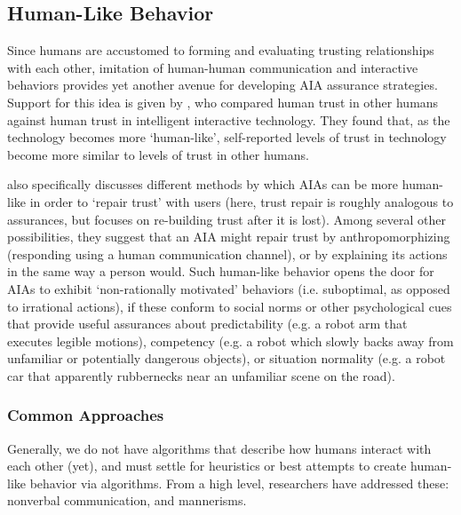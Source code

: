 \subsection{Human-Like Behavior} \label{sec:human_behavior}
Since humans are accustomed to forming and evaluating trusting relationships with each other, imitation of human-human communication and interactive behaviors provides yet another avenue for developing AIA assurance strategies. 
Support for this idea is given by \citet{Tripp2011-rx}, who compared human trust in other humans against human trust in intelligent interactive technology. 
They found that, as the technology becomes more `human-like', self-reported levels of trust in technology become more similar to levels of trust in other humans.

\citet{De_Visser2018-kd} also specifically discusses different methods by which AIAs can be more human-like in order to `repair trust' with users (here, trust repair is roughly analogous to assurances, but focuses on re-building trust after it is lost). Among several other possibilities, they suggest that an AIA might repair trust by anthropomorphizing (responding using a human communication channel), or by explaining its actions in the same way a person would. 
Such human-like behavior opens the door for AIAs to exhibit `non-rationally motivated' behaviors (i.e. suboptimal, as opposed to irrational actions), if these conform to social norms or other psychological cues that provide useful assurances about predictability (e.g. a robot arm that executes legible motions), competency (e.g. a robot which slowly backs away from unfamiliar or potentially dangerous objects), or situation normality (e.g. a robot car that apparently rubbernecks near an unfamiliar scene on the road). 

\subsubsection{Common Approaches}
Generally, we do not have algorithms that describe how humans interact with each other (yet), and must settle for heuristics or best attempts to create human-like behavior via algorithms. From a high level, researchers have addressed these: nonverbal communication, and mannerisms.

